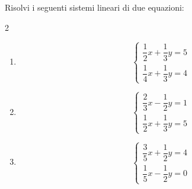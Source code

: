 
\begin{question}[ID=2.4, subtitle={Sistemi con denominatori diversi}, difficulty=difficile, tags={sistemi, equazioni lineari, frazioni}]
Risolvi i seguenti sistemi lineari di due equazioni:
\begin{multicols}{2}
\begin{enumerate}[leftmargin=3.2cm]
    \item
    \[
    \begin{cases}
    \dfrac{1}{2}x+\dfrac{1}{3}y=5\\
    \dfrac{1}{4}x+\dfrac{1}{3}y=4
    \end{cases}
    \]

    \item
    \[
    \begin{cases}
    \dfrac{2}{3}x-\dfrac{1}{2}y=1\\
    \dfrac{1}{2}x+\dfrac{1}{3}y=5
    \end{cases}
    \]

    \item
    \[
    \begin{cases}
    \dfrac{3}{5}x+\dfrac{1}{2}y=4\\
    \dfrac{1}{5}x-\dfrac{1}{2}y=0
    \end{cases}
    \]


\end{enumerate}
\end{multicols}
\end{question}
